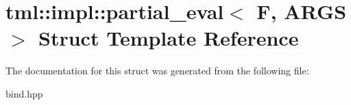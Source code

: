 \hypertarget{structtml_1_1impl_1_1partial__eval}{\section{tml\+:\+:impl\+:\+:partial\+\_\+eval$<$ F, A\+R\+G\+S $>$ Struct Template Reference}
\label{structtml_1_1impl_1_1partial__eval}
}


The documentation for this struct was generated from the following file\+:\begin{DoxyCompactItemize}
\item 
bind.\+hpp\end{DoxyCompactItemize}
